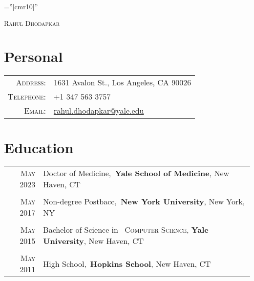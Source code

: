 \documentclass[a4paper,10pt]{article}
\begin{document}

\pagestyle{empty} %

\font\fb=''[cmr10]'' %

\par{\centering
		{\Huge \textsc{Rahul Dhodapkar}
	}\bigskip\par}

\section{Personal}

\begin{tabular}{rl}
    \textsc{Address:}   & 1631 Avalon St., Los Angeles, CA 90026 \\
    \textsc{Telephone:}      & +1 347 563 3757\\
    \textsc{Email:}       & \href{mailto:rahul.dhodapkar@yale.edu}{rahul.dhodapkar@yale.edu}
\end{tabular}

\section{Education}
\begin{tabular}{rl}	
 \textsc{May} 2023 & Doctor of Medicine,\
 \textbf{Yale School of Medicine}, New Haven, CT\\
\\
 \textsc{May} 2017 & Non-degree Postbacc,\
 \textbf{New York University}, New York, NY\\
\\
 \textsc{May} 2015 & Bachelor of Science in \
 \textsc{Computer Science}, \textbf{Yale University}, New Haven, CT\\
\\
\textsc{May} 2011 & High School,\
 \normalsize \textbf{Hopkins School}, New Haven, CT\\
\end{tabular}
\end{document}
